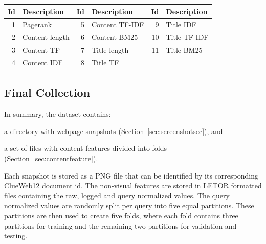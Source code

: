 \begin{table}[h]
\centering
{}  \label{tab:setdescription} 
\begin{tabular}{rlrlrl}
\toprule
Id & Description & Id & Description & Id & Description    \\ 
\midrule
1  & Pagerank  & 5  & Content TF-IDF  & 9  & Title IDF   \\
2  & Content length & 6  & Content BM25   & 10 & Title TF-IDF   \\
3  & Content TF  & 7  & Title length & 11 & Title BM25  \\
4  & Content IDF & 8  & Title TF  & & \\
\bottomrule
\end{tabular}
\end{table}

\subsection{Final Collection}\label{sec:finalcollection}
In summary, the \datasetname{} dataset contains:
\begin{inparaenum}[(i)]
\item a directory with webpage snapshots (Section~\ref{sec:screenshotsec}), and
\item a set of files with content features divided into folds (Section~\ref{sec:contentfeature}).
\end{inparaenum}
Each snapshot is stored as a PNG file that can be identified by its corresponding ClueWeb12 document id. 
The non-visual features are stored in LETOR formatted files containing the raw, logged and query normalized values.
The query normalized values are randomly split per query into five equal partitions.
These partitions are then used to create five folds, where each fold contains three partitions for training and the remaining two partitions for validation and testing.


